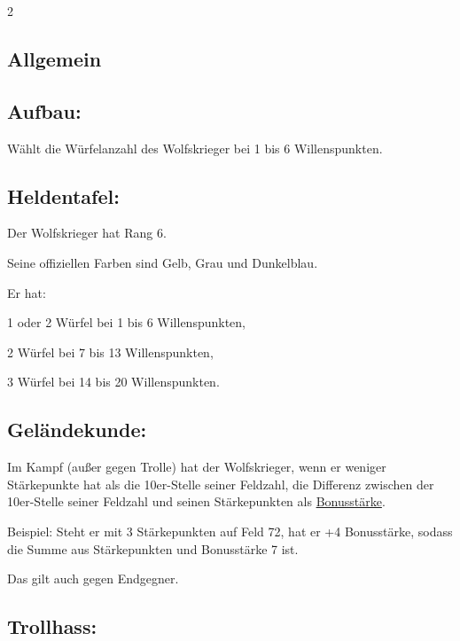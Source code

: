 \documentclass[10pt, a4paper, oneside]{book}
\begin{document}
\begin{multicols*}{2}\raggedcolumns



\begin{nobgcolor}

\section{Allgemein}

\subsection{Aufbau:}

Wählt die Würfelanzahl des Wolfskrieger bei 1 bis 6 Willenspunkten.


\subsection{Heldentafel:}

Der Wolfskrieger hat Rang 6.

Seine offiziellen Farben sind Gelb, Grau und Dunkelblau.

Er hat:

\bullet{} 1 oder 2 Würfel bei 1 bis 6 Willenspunkten,

\bullet{} 2 Würfel bei 7 bis 13 Willenspunkten,

\bullet{} 3 Würfel bei 14 bis 20 Willenspunkten.






\subsection{Geländekunde:}

Im Kampf (außer gegen Trolle) hat der Wolfskrieger, wenn er weniger Stärkepunkte hat als die 10er-Stelle seiner Feldzahl, die Differenz zwischen der 10er-Stelle seiner Feldzahl und seinen Stärkepunkten als \hyperref[Bonusstärke]{Bonusstärke}.

Beispiel: Steht er mit 3 Stärkepunkten auf Feld 72, hat er +4 Bonusstärke, sodass die Summe aus Stärkepunkten und Bonusstärke 7 ist.

Das gilt auch gegen Endgegner.



\subsection{Trollhass:}


\end{nobgcolor}
\end{multicols*}
\end{document}
